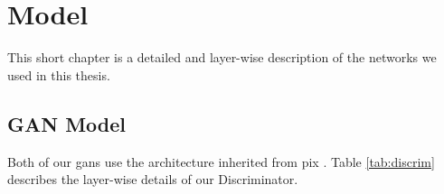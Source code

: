 
\chapter{Model}
\label{cha:model}

This short chapter is a detailed and layer-wise description of the networks we used in this thesis.

\section{GAN Model}
\label{sec:gan_model}

Both of our \acrshort{gan}s use the architecture inherited from \acrshort{pix}
\cite{pix2pix}. Table \ref{tab:discrim} describes the layer-wise details of our
Discriminator.

